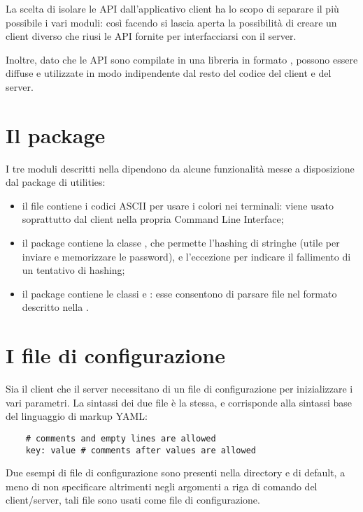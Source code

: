 \documentclass[
    oneside,
    10pt,
    language=italian,
    a4paper,
    article
]{notes}
\begin{document}
La scelta di isolare le API dall'applicativo client ha lo scopo di separare il
più possibile i vari moduli: così facendo si lascia aperta la possibilità
di creare un client diverso che riusi le API fornite per interfacciarsi con
il server.

Inoltre, dato che le API sono compilate in una libreria in formato ,
possono essere diffuse e utilizzate in modo indipendente dal resto del codice
del client e del server. 

\section{Il package }
I tre moduli descritti nella  dipendono da alcune funzionalità
messe a disposizione dal package di utilities:
\begin{itemize}
    \item il file  contiene i codici ASCII
        per usare i colori nei terminali: viene usato soprattutto dal client
        nella propria Command Line Interface;
    \item il package  contiene la classe
        , che permette l'hashing di stringhe (utile per
        inviare e memorizzare le password), e l'eccezione 
         per indicare il fallimento di un tentativo
        di hashing;
    \item il package  contiene le classi
         e : esse consentono di parsare
        file nel formato descritto nella .
\end{itemize}

\section{I file di configurazione} \label{sec:config}
Sia il client che il server necessitano di un file di configurazione per 
inizializzare i vari parametri. La sintassi dei due file è la stessa, e corrisponde
alla sintassi base del linguaggio di markup YAML:
\begin{verbatim}
    # comments and empty lines are allowed
    key: value # comments after values are allowed
\end{verbatim}
Due esempi di file di configurazione sono presenti nella directory 
e di default, a meno di non specificare altrimenti negli argomenti a riga di
comando del client/server, tali file sono usati come file di configurazione.  
\end{document}
